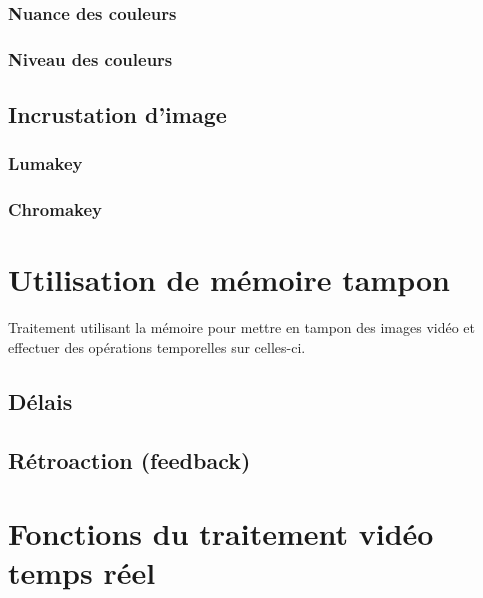 \documentclass[
  french,
]{book}
\begin{document}
\hypertarget{nuance-des-couleurs}{%
\subsubsection{Nuance des couleurs}\label{nuance-des-couleurs}}

\hypertarget{niveau-des-couleurs}{%
\subsubsection{Niveau des couleurs}\label{niveau-des-couleurs}}

\hypertarget{incrustation-dimage}{%
\subsection{Incrustation d'image}\label{incrustation-dimage}}

\hypertarget{lumakey}{%
\subsubsection{Lumakey}\label{lumakey}}

\hypertarget{chromakey}{%
\subsubsection{Chromakey}\label{chromakey}}

\hypertarget{utilisation-de-muxe9moire-tampon}{%
\section{Utilisation de mémoire tampon}\label{utilisation-de-muxe9moire-tampon}}

Traitement utilisant la mémoire pour mettre en tampon des images vidéo et effectuer des opérations temporelles sur celles-ci.

\hypertarget{duxe9lais}{%
\subsection{Délais}\label{duxe9lais}}

\hypertarget{ruxe9troaction-feedback}{%
\subsection{Rétroaction (feedback)}\label{ruxe9troaction-feedback}}

\hypertarget{fonctions-du-traitement-viduxe9o-temps-ruxe9el}{%
\section{Fonctions du traitement vidéo temps réel}\label{fonctions-du-traitement-viduxe9o-temps-ruxe9el}}
\end{document}
